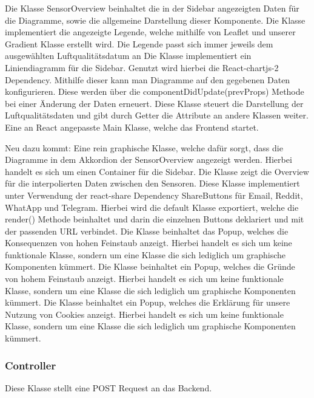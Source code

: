     Die Klasse SensorOverview beinhaltet die in der Sidebar angezeigten Daten für die Diagramme, sowie die allgemeine Darstellung dieser Komponente.
    Die Klasse implementiert die angezeigte Legende, welche mithilfe von \gls{Leaflet} und unserer Gradient Klasse erstellt wird.
    Die Legende passt sich immer jeweils dem ausgewählten Luftqualitätsdatum an
    Die Klasse implementiert ein Liniendiagramm für die Sidebar. Genutzt wird hierbei die React-chartjs-2 Dependency.
    Mithilfe dieser kann man Diagramme auf den gegebenen Daten konfigurieren. Diese werden über die componentDidUpdate(prevProps) Methode
    bei einer Änderung der Daten erneuert.
    \removedClass
{}
    \removedClass
{}
    Diese Klasse steuert die Darstellung der Luftqualitätsdaten und gibt durch Getter die Attribute an andere Klassen weiter.
    Eine an React angepasste Main Klasse, welche das Frontend startet.

Neu dazu kommt:
    Eine rein graphische Klasse, welche dafür sorgt, dass die Diagramme in dem Akkordion der SensorOverview angezeigt werden.
    Hierbei handelt es sich um einen Container für die Sidebar.
    Die Klasse zeigt die Overview für die interpolierten Daten zwischen den Sensoren.
    Diese Klasse implementiert unter Verwendung der react-share Dependency ShareButtons für Email, Reddit, WhatApp und Telegram.
    Hierbei wird die default Klasse exportiert, welche die render() Methode beinhaltet und darin die einzelnen Buttons deklariert und 
    mit der passenden URL verbindet.
    Die Klasse beinhaltet das Popup, welches die Konsequenzen von hohen Feinstaub anzeigt. Hierbei handelt es sich um keine funktionale Klasse, sondern um eine Klasse die sich lediglich um graphische Komponenten kümmert.
    Die Klasse beinhaltet ein Popup, welches die Gründe von hohem Feinstaub anzeigt. Hierbei handelt es sich um keine funktionale Klasse, sondern um eine Klasse die sich
    lediglich um graphische Komponenten kümmert.
    Die Klasse beinhaltet ein Popup, welches die Erklärung für unsere Nutzung von \gls{Cookie}s anzeigt. Hierbei handelt es sich um keine funktionale Klasse, sondern um eine Klasse die sich lediglich um graphische Komponenten kümmert.

\subsubsection{Controller}
    Diese Klasse stellt eine POST Request an das Backend.
